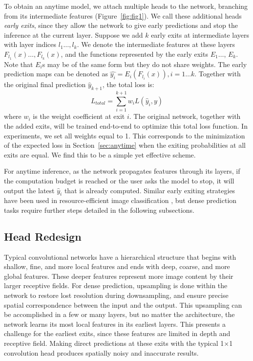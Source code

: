To obtain an anytime model, we attach multiple heads to the network, branching from its intermediate features (Figure~\ref{fig:fig1}).
We call these additional heads \emph{early exits}, since they allow the network to give early predictions and stop the inference at the current layer.
Suppose we add $k$ early exits at intermediate layers with layer indices $l_1 \dots, l_k$.
We denote the intermediate features at these layers $F_{l_1}(x) \dots, F_{l_k}(x)$, and the functions represented by the early exits $E_1 \dots$, $E_k$. 
Note that $E_i$s may be of the same form but they do not share weights.
The early prediction maps can be denoted as $\hat{y_i} = E_i(F_{l_i}(x)), i = 1 \dots k$.
Together with the original final prediction $\hat{y}_{k+1}$, the total loss is: 
\begin{equation}
L_{total} = \sum_{i=1}^{k+1} {w_i}L(\hat{y}_i, y)
\end{equation}
where $w_i$ is the weight coefficient at exit $i$.
The original network, together with the added exits, will be trained end-to-end to optimize this total loss function.
In experiments, we set all weights equal to 1.
This corresponds to the minimization of the expected loss in Section~\ref{sec:anytime} when the exiting probabilities at all exits are equal.
We find this to be a simple yet effective scheme.

For anytime inference, as the network propagates features through its layers, if the computation budget is reached or the user asks the model to stop, it will output the latest $\hat{y}_{i}$ that is already computed.
Similar early exiting strategies have been used in  resource-efficient image classification \cite{teerapittayanon2016branchynet,huang2017multi}, but dense prediction tasks require further steps detailed in the following subsections.

\subsection{Head Redesign}
\label{sec:rh}
Typical convolutional networks have a hierarchical structure that begins with shallow, fine, and more local features and ends with deep, coarse, and more global features.
These deeper features represent more image content by their larger receptive fields.
For dense prediction, upsampling is done within the network to restore lost resolution during downsampling, and ensure precise spatial correspondence between the input and the output. 
This upsampling can be accomplished in a few \cite{fcn} or many \cite{zhao2017pyramid} layers, but no matter the architecture, the network learns its most local features in its earliest layers.
This presents a challenge for the earliest exits, since these features are limited in depth and receptive field.
Making direct predictions at these exits 
with the typical 1$\times$1 convolution head
produces spatially noisy and inaccurate results.

